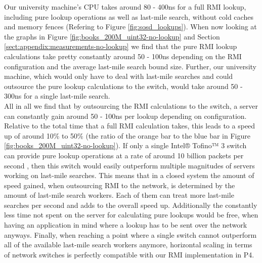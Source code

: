 Our university machine's CPU takes around 80 - 400ns for a full RMI lookup, including pure lookup operations as well as last-mile search, without cold caches and memory fences (Refering to Figure \ref{fig:sosd_lookups}). When now looking at the graphs in Figure \ref{fig:books_200M_uint32-no-lookup} and Section \ref{sect:appendix:measurements-no-lookup} we find that the pure RMI lookup calculations take pretty constantly around 50 - 100ns depending on the RMI configuration and the average last-mile search bound size. Further, our university machine, which would only have to deal with last-mile searches and could outsource the pure lookup calculations to the switch, would take around 50 - 300ns for a single last-mile search.\\

All in all we find that by outsourcing the RMI calculations to the switch, a server can constantly gain around 50 - 100ns per lookup depending on configuration. Relative to the total time that a full RMI calculation takes, this leads to a speed up of around 10\% to 50\% (the ratio of the orange bar to the blue bar in Figure \ref{fig:books_200M_uint32-no-lookup}). If only a single Intel® Tofino™ 3 switch can provide pure lookup operations at a rate of around 10 billion packets per second \cite{tofino3-brief}, then this switch would easily outperform multiple magnitudes of servers working on last-mile searches. This means that in a closed system the amount of speed gained, when outsourcing RMI to the network, is determined by the amount of last-mile search workers. Each of them can treat more last-mile searches per second and adds to the overall speed up. Additionally the constantly less time not spent on the server for calculating pure lookups would be free, when having an application in mind where a lookup has to be sent over the network anyways. Finally, when reaching a point where a single switch cannot outperform all of the available last-mile search workers anymore, horizontal scaling in terms of network switches is perfectly compatible with our RMI implementation in P4.\\
